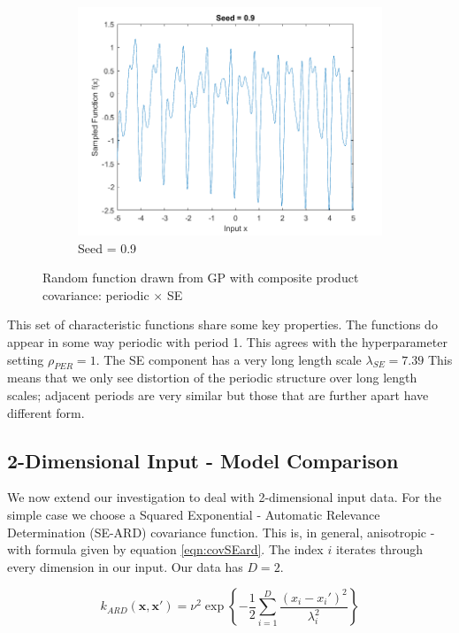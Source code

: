 \documentclass[]{article}
\begin{document}
\begin{figure}[!h]
\begin{subfigure}{0.3\linewidth}
		\includegraphics[width=\linewidth]{1d3}
		\caption{Seed = 0.9}
		\label{fig:1d3}
	\end{subfigure}
	\caption{Random function drawn from GP with composite product covariance: periodic $\times$ SE}
	\label{fig:1d}
\end{figure}

This set of characteristic functions share some key properties. The functions do appear in some way periodic with period 1. This agrees with the hyperparameter setting $\rho_{PER}=1$. The SE component has a very long length scale $\lambda_{SE}=7.39$ This means that we only see distortion of the periodic structure over long length scales; adjacent periods are very similar but those that are further apart have different form.

\subsection{2-Dimensional Input - Model Comparison}

We now extend our investigation to deal with 2-dimensional input data. For the simple case we choose a Squared Exponential - Automatic Relevance Determination (SE-ARD) covariance function. This is, in general, anisotropic - with formula given by equation \ref{eqn:covSEard}. The index $i$ iterates through every dimension in our input. Our data has $D=2$.

\begin{equation}
k_{ARD}(\mathbf{x}, \mathbf{x}') = \nu^2 \exp\left\{- \frac{1}{2} \sum_{i=1}^{D}\frac{(x_i-x_i')^2}{\lambda_i^2}\right\}
\label{eqn:covSEard}
\end{equation}
\end{document}
